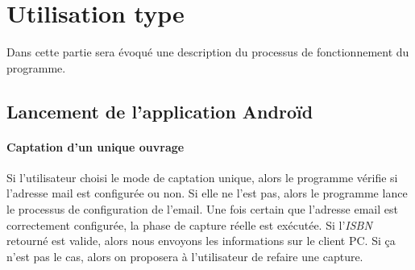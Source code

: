 \section{Utilisation type}
Dans cette partie sera évoqué une description du processus de fonctionnement du programme.

\subsection{Lancement de l'application Androïd}

\paragraph{Captation d'un unique ouvrage} 


Si l'utilisateur choisi le mode de captation unique, alors le programme vérifie si l'adresse mail est configurée ou non. 
Si elle ne l'est pas, alors le programme lance le processus de configuration de l'email. 
Une fois certain que l'adresse email est correctement configurée, la phase de capture réelle est exécutée. 
Si l'\emph{ISBN} retourné est valide, alors nous envoyons les informations sur le client PC. 
Si ça n'est pas le cas, alors on proposera à l'utilisateur de refaire une capture. 


\begin{figure}[htbp]
  \begin{center}
    \leavevmode
    \hspace{4cm}
  \end{center}
\end{figure}

